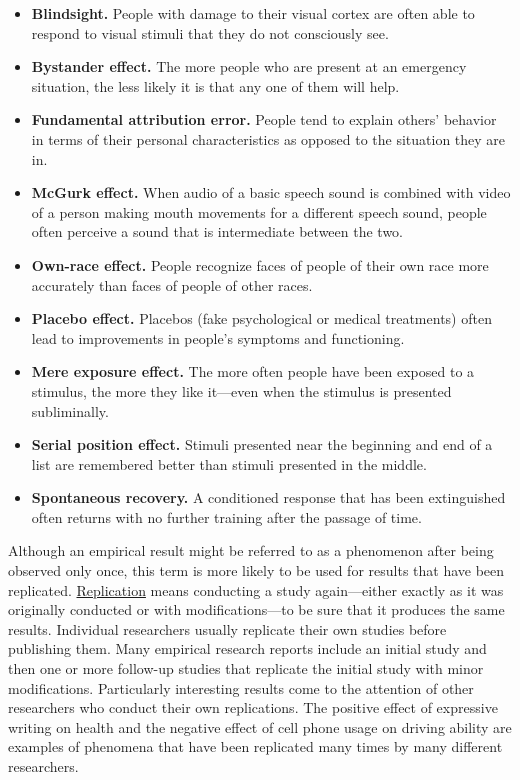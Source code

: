 \documentclass[
]{krantz}
\providecommand{\tightlist}{%
  \setlength{\itemsep}{0pt}\setlength{\parskip}{0pt}}
\begin{document}
\begin{itemize}
\tightlist
\item
  \textbf{Blindsight.} People with damage to their visual cortex are often able to respond to visual stimuli that they do not consciously see.
\item
  \textbf{Bystander effect.} The more people who are present at an emergency situation, the less likely it is that any one of them will help.
\item
  \textbf{Fundamental attribution error.} People tend to explain others' behavior in terms of their personal characteristics as opposed to the situation they are in.
\item
  \textbf{McGurk effect.} When audio of a basic speech sound is combined with video of a person making mouth movements for a different speech sound, people often perceive a sound that is intermediate between the two.
\item
  \textbf{Own-race effect.} People recognize faces of people of their own race more accurately than faces of people of other races.
\item
  \textbf{Placebo effect.} Placebos (fake psychological or medical treatments) often lead to improvements in people's symptoms and functioning.
\item
  \textbf{Mere exposure effect.} The more often people have been exposed to a stimulus, the more they like it---even when the stimulus is presented subliminally.
\item
  \textbf{Serial position effect.} Stimuli presented near the beginning and end of a list are remembered better than stimuli presented in the middle.
\item
  \textbf{Spontaneous recovery.} A conditioned response that has been extinguished often returns with no further training after the passage of time.
\end{itemize}

Although an empirical result might be referred to as a phenomenon after being observed only once, this term is more likely to be used for results that have been replicated. \protect\hyperlink{replication}{Replication} means conducting a study again---either exactly as it was originally conducted or with modifications---to be sure that it produces the same results. Individual researchers usually replicate their own studies before publishing them. Many empirical research reports include an initial study and then one or more follow-up studies that replicate the initial study with minor modifications. Particularly interesting results come to the attention of other researchers who conduct their own replications. The positive effect of expressive writing on health and the negative effect of cell phone usage on driving ability are examples of phenomena that have been replicated many times by many different researchers.
\end{document}
